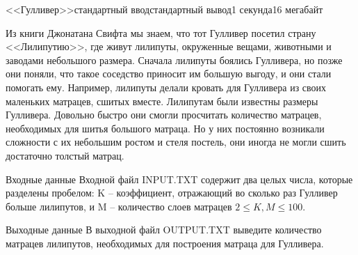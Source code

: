 \begin{problem}{<<Гулливер>>}{стандартный ввод}{стандартный вывод}{1 секунда}{16 мегабайт}

Из книги Джонатана Свифта мы знаем, что тот Гулливер посетил страну <<Лилипутию>>, где живут лилипуты, окруженные вещами, животными и заводами небольшого размера. Сначала лилипуты боялись Гулливера, но позже они поняли, что такое соседство приносит им большую выгоду, и они стали помогать ему. Например, лилипуты делали кровать для Гулливера из своих маленьких матрацев, сшитых вместе. Лилипутам были известны размеры Гулливера. Довольно быстро они смогли просчитать количество матрацев, необходимых для шитья большого матраца. Но у них постоянно возникали сложности с их небольшим ростом и стеля постель, они иногда не могли сшить достаточно толстый матрац.

\InputFile
Входные данные
Входной файл INPUT.TXT содержит два целых числа, которые разделены пробелом: K -- коэффициент, отражающий во сколько раз Гулливер больше лилипутов, и M -- количество слоев матрацев $2 \le K, M \le 100$.

\OutputFile
Выходные данные
В выходной файл OUTPUT.TXT выведите количество матрацев лилипутов, необходимых для построения матраца для Гулливера.

\Example

\begin{example}
%
\end{example}

\end{problem}

